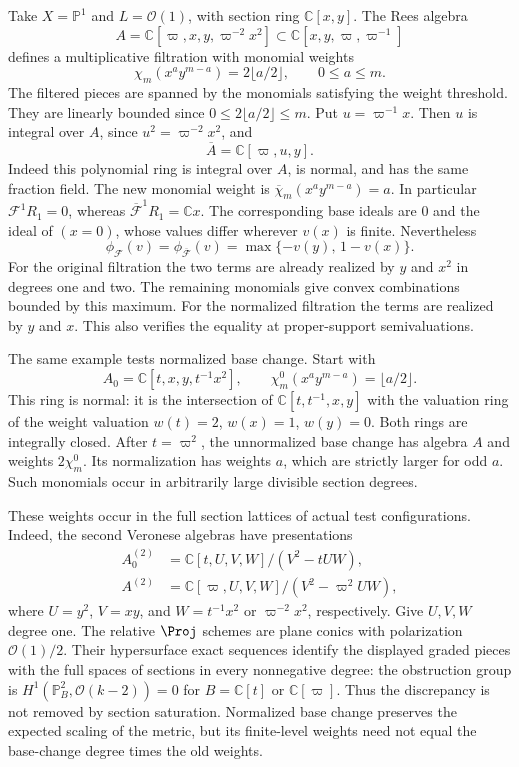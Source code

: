 \pagebreak[4]
\begin{example}\label{ex:rf-normalization-changes-weights}
Take $X=\mathbb P^1$ and $L=\mathcal O(1)$, with section ring $\mathbb C[x,y]$. The Rees algebra
\[
 A=\mathbb C[\varpi,x,y,\varpi^{-2}x^2]
      \subset\mathbb C[x,y,\varpi,\varpi^{-1}]
\]
defines a multiplicative filtration with monomial weights
\[
 \chi_m(x^a y^{m-a})=2\lfloor a/2\rfloor,
 \qquad 0\leq a\leq m.
\tag{65.9a}\label{eq:rf-nonnormal-weights}
\]
The filtered pieces are spanned by the monomials satisfying the weight threshold. They are linearly bounded since $0\leq2\lfloor a/2\rfloor\leq m$. Put $u=\varpi^{-1}x$. Then $u$ is integral over $A$, since $u^2=\varpi^{-2}x^2$, and
\[
                    \overline A=\mathbb C[\varpi,u,y].
\]
Indeed this polynomial ring is integral over $A$, is normal, and has the same fraction field. The new monomial weight is $\overline\chi_m(x^a y^{m-a})=a$. In particular $\mathcal F^1R_1=0$, whereas $\overline{\mathcal F}^{1}R_1=\mathbb Cx$. The corresponding base ideals are $0$ and the ideal of $(x=0)$, whose values differ wherever $v(x)$ is finite. Nevertheless
\[
 \phi_{\mathcal F}(v)=\phi_{\overline{\mathcal F}}(v)
                         =\max\{-v(y),\,1-v(x)\}.
\tag{65.9b}\label{eq:rf-normalization-same-fs}
\]
For the original filtration the two terms are already realized by $y$ and $x^2$ in degrees one and two. The remaining monomials give convex combinations bounded by this maximum. For the normalized filtration the terms are realized by $y$ and $x$. This also verifies the equality at proper-support semivaluations.

The same example tests normalized base change. Start with
\[
 A_0=\mathbb C[t,x,y,t^{-1}x^2],\qquad
       \chi^0_m(x^a y^{m-a})=\lfloor a/2\rfloor.
\]
This ring is normal: it is the intersection of $\mathbb C[t,t^{-1},x,y]$ with the valuation ring of the weight valuation $w(t)=2$, $w(x)=1$, $w(y)=0$. Both rings are integrally closed. After $t=\varpi^2$, the unnormalized base change has algebra $A$ and weights $2\chi^0_m$. Its normalization has weights $a$, which are strictly larger for odd $a$. Such monomials occur in arbitrarily large divisible section degrees.

These weights occur in the full section lattices of actual test configurations. Indeed, the second Veronese algebras have presentations
\[
 \begin{aligned}
 A_0^{(2)}&=\mathbb C[t,U,V,W]/(V^2-tUW),\\
 A^{(2)}&=\mathbb C[\varpi,U,V,W]/(V^2-\varpi^2UW),
 \end{aligned}
\]
where $U=y^2$, $V=xy$, and $W=t^{-1}x^2$ or $\varpi^{-2}x^2$, respectively. Give $U,V,W$ degree one. The relative $\Proj$ schemes are plane conics with polarization $\mathcal O(1)/2$. Their hypersurface exact sequences identify the displayed graded pieces with the full spaces of sections in every nonnegative degree: the obstruction group is $H^1(\mathbb P^2_B,\mathcal O(k-2))=0$ for $B=\mathbb C[t]$ or $\mathbb C[\varpi]$. Thus the discrepancy is not removed by section saturation. Normalized base change preserves the expected scaling of the metric, but its finite-level weights need not equal the base-change degree times the old weights.
\end{example}

